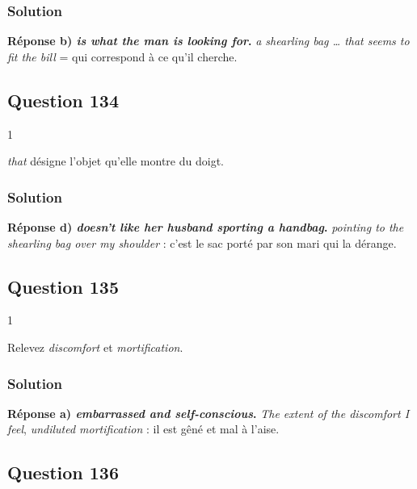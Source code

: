 \documentclass[11pt,a4paper]{article}
\begin{document}
\hypertarget{solution-132}{%
\subsubsection{Solution}\label{solution-132}}

\textbf{Réponse b) \emph{is what the man is looking for}.} \emph{a shearling bag \ldots{} that seems to fit the bill} = qui correspond à ce qu'il cherche.

\hypertarget{question-134}{%
\subsection{Question 134}\label{question-134}}

\begin{indication}{1}

\emph{that} désigne l'objet qu'elle montre du doigt.

\end{indication}

\hypertarget{solution-133}{%
\subsubsection{Solution}\label{solution-133}}

\textbf{Réponse d) \emph{doesn't like her husband sporting a handbag}.} \emph{pointing to the shearling bag over my shoulder} : c'est le sac porté par son mari qui la dérange.

\hypertarget{question-135}{%
\subsection{Question 135}\label{question-135}}

\begin{indication}{1}

Relevez \emph{discomfort} et \emph{mortification}.

\end{indication}

\hypertarget{solution-134}{%
\subsubsection{Solution}\label{solution-134}}

\textbf{Réponse a) \emph{embarrassed and self-conscious}.} \emph{The extent of the discomfort I feel}, \emph{undiluted mortification} : il est gêné et mal à l'aise.

\hypertarget{question-136}{%
\subsection{Question 136}\label{question-136}}
\end{document}
